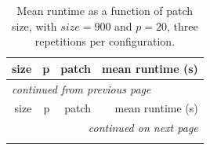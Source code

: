 \begin{longtable}{rrrr}
  \caption{\label{tab:patch_optimal}Mean runtime as a function of patch size, with $size = 900$ and $p = 20$, three repetitions per configuration.}\\
  \toprule
  size & p & patch & mean runtime (s)\\
  \midrule
  \endfirsthead

  \multicolumn{4}{l}{\small\itshape continued from previous page}\\
  \toprule
  size & p & patch & mean runtime (s)\\
  \midrule
  \endhead

  \midrule
  \multicolumn{4}{r}{\small\itshape continued on next page}\\
  \endfoot

  \bottomrule
  \endlastfoot


\end{longtable}

